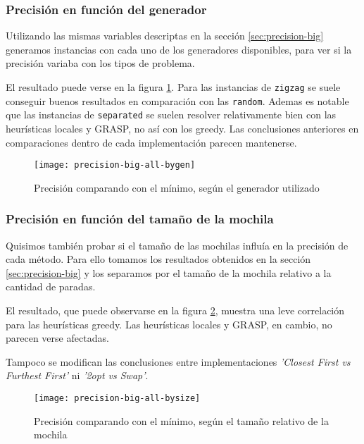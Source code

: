\subsubsection{Precisión en función del generador}

Utilizando las mismas variables descriptas en la sección \ref{sec:precision-big} generamos instancias con cada uno de los generadores disponibles, para ver si la precisión variaba con los tipos de problema.

El resultado puede verse en la figura \ref{fig:precision-big-all-bygen}.
Para las instancias de \texttt{zigzag} se suele conseguir buenos resultados en comparación con las \texttt{random}.
Ademas es notable que las instancias de \texttt{separated} se suelen resolver relativamente bien con las heurísticas locales y GRASP, no así con los greedy. Las conclusiones anteriores en comparaciones dentro de cada implementación parecen mantenerse.

\begin{figure}[H]
    \centering
    \texttt{[image: precision-big-all-bygen]}
    \caption{Precisión comparando con el mínimo, según el generador utilizado}
    \label{fig:precision-big-all-bygen}
\end{figure}

\subsubsection{Precisión en función del tamaño de la mochila}

Quisimos también probar si el tamaño de las mochilas influía en la precisión de cada método.
Para ello tomamos los resultados obtenidos en la sección \ref{sec:precision-big} y los separamos
por el tamaño de la mochila relativo a la cantidad de paradas.

El resultado, que puede observarse en la figura \ref{fig:precision-big-all-bysize},
muestra una leve correlación para las heurísticas greedy. Las heurísticas locales y GRASP, en cambio, no parecen verse afectadas.

Tampoco se modifican las conclusiones entre implementaciones \emph{'Closest First vs Furthest First'} ni \emph{'2opt vs Swap'}.

\begin{figure}[H]
    \centering
    \texttt{[image: precision-big-all-bysize]}
    \caption{Precisión comparando con el mínimo, según el tamaño relativo de la mochila}
    \label{fig:precision-big-all-bysize}
\end{figure}

